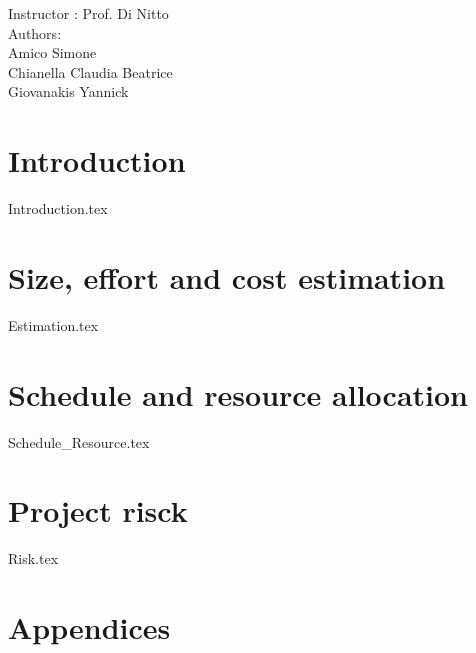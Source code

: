 \documentclass[12pt]{article}
\begin{document}
	\begin{center}
	 	{\Large Instructor : Prof. Di Nitto}
	 	 \vspace{5mm}\\	 
	 	{\Large Authors:}\\
	 	{\Large Amico Simone}\\
	 	{\Large Chianella Claudia Beatrice}\\
	 	{\Large Giovanakis Yannick}
	\end{center}
	 
	\newpage
	
	
	\tableofcontents{}
	 
	\newpage
		
	
	\section{Introduction}
	{Introduction.tex}
	
	\newpage

	
	\section{Size, effort and cost estimation}
	{Estimation.tex}
	
	\newpage
	
	\section{Schedule and resource allocation}
	{Schedule_Resource.tex}
	
	\newpage
	
	\section{Project risck}
	{Risk.tex}
	\newpage
	
			
	\section{Appendices}
\end{document}
